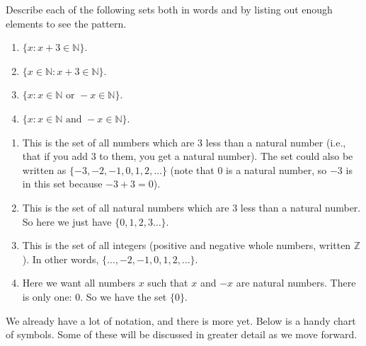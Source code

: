 \documentclass[11pt,]{book}
\theoremstyle{ptxplainnotitle}
\theoremstyle{ptxplaintitle}
\theoremstyle{ptxdefinitionnotitle}
\theoremstyle{ptxdefinitiontitle}
\theoremstyle{ptxdefinitionnotitle}
\theoremstyle{ptxdefinitiontitle}
\theoremstyle{ptxdefinitionnotitle}
\theoremstyle{ptxdefinitiontitle}
\theoremstyle{ptxdefinitiontitlenonumber}
\theoremstyle{ptxdefinitiontitlenonumber}
\numberwithin{equation}{chapter}
\newcommand{\N}{\mathbb N}
\newcommand{\Z}{\mathbb Z}
\newcommand{\st}{:}
\begin{document}
\begin{example}\label{example-28}
\hypertarget{p-685}{}%
Describe each of the following sets both in words and by listing out enough elements to see the pattern.%
\par
\hypertarget{p-686}{}%
\leavevmode%
\begin{enumerate}
\item\hypertarget{li-256}{}\(\{x \st x + 3 \in \N\}\).%
\item\hypertarget{li-257}{}\(\{x \in \N \st x + 3 \in \N\}\).%
\item\hypertarget{li-258}{}\(\{x \st x \in \N \text{ or } -x \in \N\}\).%
\item\hypertarget{li-259}{}\(\{x \st x \in \N \text{ and } -x \in \N\}\).%
\end{enumerate}
%
\par\smallskip%
\noindent\textbf{}\hypertarget{solution-103}{}\hypertarget{p-687}{}%
\leavevmode%
\begin{enumerate}
\item\hypertarget{li-260}{}\hypertarget{p-688}{}%
This is the set of all numbers which are 3 less than a natural number (i.e., that if you add 3 to them, you get a natural number). The set could also be written as \(\{-3, -2, -1, 0, 1, 2, \ldots\}\) (note that 0 is a natural number, so \(-3\) is in this set because \(-3 + 3 = 0\)).%
\item\hypertarget{li-261}{}\hypertarget{p-689}{}%
This is the set of all natural numbers which are 3 less than a natural number. So here we just have \(\{0, 1, 2,3 \ldots\}\).%
\item\hypertarget{li-262}{}\hypertarget{p-690}{}%
This is the set of all integers  (positive and negative whole numbers, written \(\Z\)). In other words, \(\{\ldots, -2, -1, 0, 1, 2, \ldots\}\).%
\item\hypertarget{li-263}{}\hypertarget{p-691}{}%
Here we want all numbers \(x\) such that \(x\) and \(-x\) are natural numbers. There is only one: 0. So we have the set \(\{0\}\).%
\end{enumerate}
%
\end{example}
\hypertarget{p-692}{}%
We already have a lot of notation, and there is more yet. Below is a handy chart of symbols. Some of these will be discussed in greater detail as we move forward.%
\end{document}
